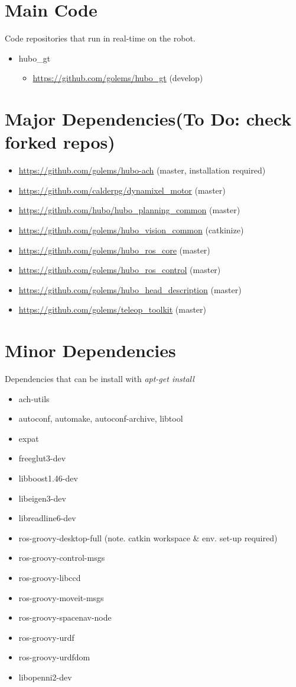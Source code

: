 \documentclass[letterpaper, 10 pt]{report}
\begin{document}
\section{Main Code}
Code repositories that run in real-time on the robot.
\begin{itemize}
\item hubo\_gt
  \begin{itemize}
	\item \url{https://github.com/golems/hubo_gt} (develop)
  \end{itemize}
\end{itemize}
\section{Major Dependencies(To Do: check forked repos)}
\begin{itemize}
  \item \url{https://github.com/golems/hubo-ach} (master, installation required)
  \item \url{https://github.com/calderpg/dynamixel_motor} (master)
  \item \url{https://github.com/hubo/hubo_planning_common} (master)
  \item \url{https://github.com/golems/hubo_vision_common} (catkinize)
  \item \url{https://github.com/golems/hubo_ros_core} (master)
  \item \url{https://github.com/golems/hubo_ros_control} (master)
  \item \url{https://github.com/golems/hubo_head_description}
   (master)
  \item \url{https://github.com/golems/teleop_toolkit} (master)
\end{itemize}
\section{Minor Dependencies}
Dependencies that can be install with \textit{apt-get install}
\begin{itemize}
  \item ach-utils
  \item autoconf, automake, autoconf-archive, libtool
  \item expat
  \item freeglut3-dev
  \item libboost1.46-dev
  \item libeigen3-dev
  \item libreadline6-dev
  \item ros-groovy-desktop-full (note. catkin workspace \& env. set-up required)
  \item ros-groovy-control-msgs
  \item ros-groovy-libccd
  \item ros-groovy-moveit-msgs
  \item ros-groovy-spacenav-node
  \item ros-groovy-urdf
  \item ros-groovy-urdfdom
  \item libopenni2-dev
\end{itemize}
\end{document}
